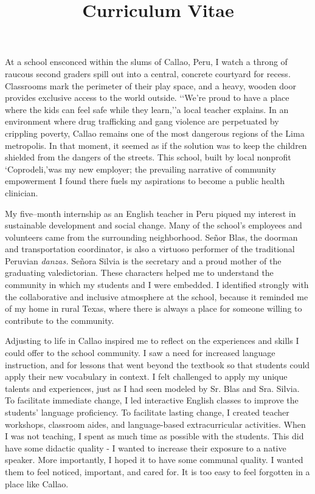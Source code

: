 \documentclass[12pt,a4paper,roman]{moderncv} %
\title{Curriculum Vitae}
\begin{document}


\clearpage


At a school ensconced within the slums of Callao, Peru, I watch a throng of raucous second graders spill out into a central, concrete courtyard for recess. Classrooms mark the perimeter of their play space, and a heavy, wooden door provides exclusive access to the world outside. \lq\lq We're proud to have a place where the kids can feel safe while they learn,\rq\rq\space a local teacher explains. In an environment where drug trafficking and gang violence are perpetuated by crippling poverty, Callao remains one of the most dangerous regions of the Lima metropolis. In that moment, it seemed as if the solution was to keep the children shielded from the dangers of the streets. This school, built by local nonprofit  \lq Coprodeli,\rq\space was my new employer; the prevailing narrative of community empowerment I found there fuels my aspirations to become a public health clinician.

\medskip
 
My five--month internship as an English teacher in Peru piqued my interest in sustainable development and social change. Many of the school's employees and volunteers came from the surrounding neighborhood. Se\~nor Blas, the doorman and transportation coordinator, is also a virtuoso performer of the traditional Peruvian \textit{danzas.} Se\~nora Silvia is the secretary and a proud mother of the graduating valedictorian.  These characters helped me to understand the community in which my students and I were embedded. I identified strongly with the collaborative and inclusive atmosphere at the school, because it reminded me of my home in rural Texas, where there is always a place for someone willing to contribute to the community.

\medskip

Adjusting to life in Callao inspired me to reflect on the experiences and skills I could offer to the school community. I saw a need for increased language instruction, and for lessons that went beyond the textbook so that students could apply their new vocabulary in context. I felt challenged to apply my unique talents and experiences, just as I had seen modeled by Sr. Blas and Sra. Silvia. To facilitate immediate change, I led interactive English classes to improve the students' language proficiency. To facilitate lasting change, I created teacher workshops, classroom aides, and language-based extracurricular activities.  When I was not teaching, I spent as much time as possible with the students. This did have some didactic quality - I wanted to increase their exposure to a native speaker. More importantly, I hoped it to have some communal quality. I wanted them to feel noticed, important, and cared for. It is too easy to feel forgotten in a place like Callao.
\end{document}
